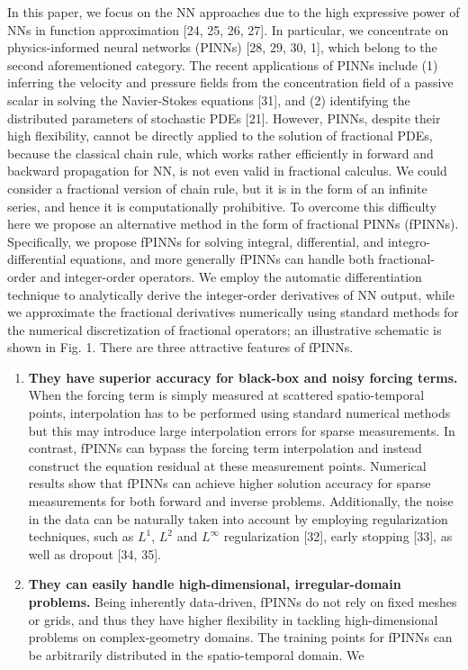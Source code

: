 \documentclass[UTF8]{article}
\begin{document}
In this paper, we focus on the NN approaches due to the high expressive power of NNs in function approximation [24, 25, 26, 27]. In particular, we concentrate on physics-informed neural networks (PINNs) [28, 29, 30, 1], which belong to the second aforementioned category. The recent applications of PINNs include (1) inferring the velocity and pressure fields from the concentration field of a passive scalar in solving the Navier-Stokes equations [31], and (2) identifying the distributed parameters of stochastic PDEs [21]. However, PINNs, despite their high flexibility, cannot be directly applied to the solution of fractional PDEs, because the classical chain rule, which works rather efficiently in forward and backward propagation for NN, is not even valid in fractional calculus. We could consider a fractional version of chain rule, but it is in the form of an infinite series, and hence it is computationally prohibitive. To overcome this difficulty here we propose an alternative method in the form of fractional PINNs (fPINNs). Specifically, we propose fPINNs for solving integral, differential, and integro-differential equations, and more generally fPINNs can handle both fractional-order and integer-order operators. We employ the automatic differentiation technique to analytically derive the integer-order derivatives of NN output, while we approximate the fractional derivatives numerically using standard methods for the numerical discretization of fractional operators; an illustrative schematic is shown in Fig. 1. There are three attractive features of fPINNs.

\begin{enumerate}
    \item \textbf{They have superior accuracy for black-box and noisy forcing terms.} When the forcing term is simply measured at scattered spatio-temporal points, interpolation has to be performed using standard numerical methods but this may introduce large interpolation errors for sparse measurements. In contrast, fPINNs can bypass the forcing term interpolation and instead construct the equation residual at these measurement points. Numerical results show that fPINNs can achieve higher solution accuracy for sparse measurements for both forward and inverse problems. Additionally, the noise in the data can be naturally taken into account by employing regularization techniques, such as $L^1$, $L^2$ and $L^\infty$ regularization [32], early stopping [33], as well as dropout [34, 35].
    \item \textbf{They can easily handle high-dimensional, irregular-domain problems.} Being inherently data-driven, fPINNs do not rely on fixed meshes or grids, and thus they have higher flexibility in tackling high-dimensional problems on complex-geometry domains. The training points for fPINNs can be arbitrarily distributed in the spatio-temporal domain. We
\end{enumerate}
\end{document}
